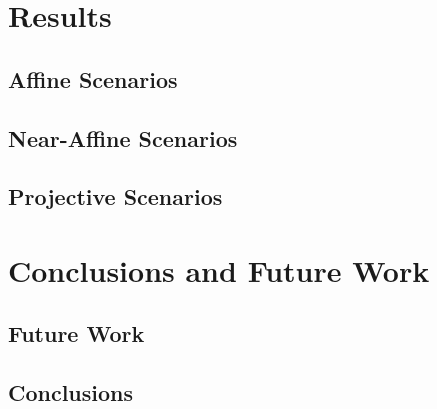 \documentclass[11pt]{report}
\begin{document}
\begin{doublespace}
\indent





\chapter{Results}

\indent


\section{Affine Scenarios}

\indent



\section{Near-Affine Scenarios}

\indent



\section{Projective Scenarios}

\indent





\chapter{Conclusions and Future Work}

\indent


\section{Future Work}

\indent


\section{Conclusions}

\indent



\end{doublespace}

\begin{singlespace}
	
	\nocite{*}
\end{singlespace}


\end{document}
